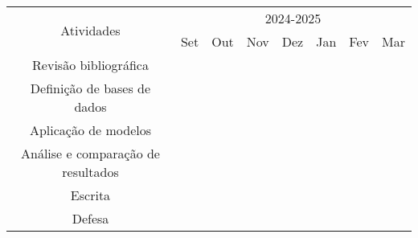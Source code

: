 \documentclass[openany, a4paper,12pt, oneside]{article}
\newcounter{loopcntr}
\newcommand{\on}[1][1]{
  \forloop{loopcntr}{0}{\value{loopcntr}<#1}{&\cellcolor{gray}}
}
\newcommand{\off}[1][1]{
  \forloop{loopcntr}{0}{\value{loopcntr}<#1}{&}
}
\begin{document}
\begin{tabular}{ | c | c | c | c | c | c | c | c | }
  \hline
  \multirow{2}{*}{Atividades} & \multicolumn{7}{c}{2024-2025} \vline                                           \\
  \cline{2-7}                 & Set                                  & Out & Nov & Dez & Jan & Fev & Mar \\
  \hline
  Revis\~{a}o bibliogr\'{a}fica \on[3] \off[4]                                                                  \\
  \hline
  Defini\c{c}\~{a}o de bases de dados \on[1] \off[6]                                                           \\

  \hline
  Aplica\c{c}\~{a}o de modelos \off[1] \on[2] \off[4]                                                          \\
  \hline
  An\'{a}lise e compara\c{c}\~{a}o de resultados \off[3] \on[2] \off[2]                                        \\
  \hline
  Escrita \off[5] \on[2]                                                                                       \\
  \hline
  Defesa \off[6] \on[1]                                                                                        \\
  \hline
\end{tabular}





\end{document}
